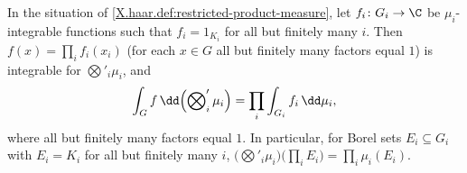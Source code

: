 In the situation of \cref{X.haar.def:restricted-product-measure}, let $f_i\colon G_i\to\C$ be $\mu_i$-integrable
functions such that $f_i=1_{K_i}$ for all but finitely many $i$. Then $f(x)=\prod_if_i(x_i)$ (for each $x\in G$ all but
finitely many factors equal $1$) is integrable for $\bigotimes'_i\mu_i$, and
\[
  \int_Gf\,\dd\Bigl(\bigotimes\nolimits'_i\mu_i\Bigr)=\prod_i\int_{G_i}f_i\,\dd\mu_i,
\]
where all but finitely many factors equal $1$. In particular, for Borel sets $E_i\subseteq G_i$ with $E_i=K_i$ for all
but finitely many $i$, $\bigl(\bigotimes'_i\mu_i\bigr)\bigl(\prod_iE_i\bigr)=\prod_i\mu_i(E_i)$.
